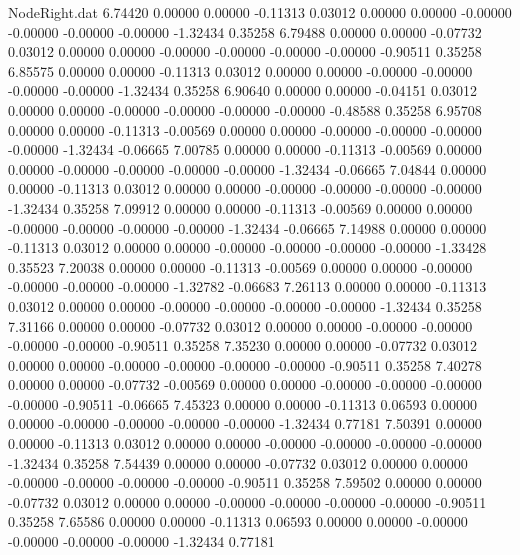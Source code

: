 \begin{filecontents}{NodeRight.dat}
   6.74420    0.00000    0.00000    -0.11313    0.03012    0.00000    0.00000   -0.00000   -0.00000   -0.00000   -0.00000   -1.32434    0.35258
   6.79488    0.00000    0.00000    -0.07732    0.03012    0.00000    0.00000   -0.00000   -0.00000   -0.00000   -0.00000   -0.90511    0.35258
   6.85575    0.00000    0.00000    -0.11313    0.03012    0.00000    0.00000   -0.00000   -0.00000   -0.00000   -0.00000   -1.32434    0.35258
   6.90640    0.00000    0.00000    -0.04151    0.03012    0.00000    0.00000   -0.00000   -0.00000   -0.00000   -0.00000   -0.48588    0.35258
   6.95708    0.00000    0.00000    -0.11313   -0.00569    0.00000    0.00000   -0.00000   -0.00000   -0.00000   -0.00000   -1.32434   -0.06665
   7.00785    0.00000    0.00000    -0.11313   -0.00569    0.00000    0.00000   -0.00000   -0.00000   -0.00000   -0.00000   -1.32434   -0.06665
   7.04844    0.00000    0.00000    -0.11313    0.03012    0.00000    0.00000   -0.00000   -0.00000   -0.00000   -0.00000   -1.32434    0.35258
   7.09912    0.00000    0.00000    -0.11313   -0.00569    0.00000    0.00000   -0.00000   -0.00000   -0.00000   -0.00000   -1.32434   -0.06665
   7.14988    0.00000    0.00000    -0.11313    0.03012    0.00000    0.00000   -0.00000   -0.00000   -0.00000   -0.00000   -1.33428    0.35523
   7.20038    0.00000    0.00000    -0.11313   -0.00569    0.00000    0.00000   -0.00000   -0.00000   -0.00000   -0.00000   -1.32782   -0.06683
   7.26113    0.00000    0.00000    -0.11313    0.03012    0.00000    0.00000   -0.00000   -0.00000   -0.00000   -0.00000   -1.32434    0.35258
   7.31166    0.00000    0.00000    -0.07732    0.03012    0.00000    0.00000   -0.00000   -0.00000   -0.00000   -0.00000   -0.90511    0.35258
   7.35230    0.00000    0.00000    -0.07732    0.03012    0.00000    0.00000   -0.00000   -0.00000   -0.00000   -0.00000   -0.90511    0.35258
   7.40278    0.00000    0.00000    -0.07732   -0.00569    0.00000    0.00000   -0.00000   -0.00000   -0.00000   -0.00000   -0.90511   -0.06665
   7.45323    0.00000    0.00000    -0.11313    0.06593    0.00000    0.00000   -0.00000   -0.00000   -0.00000   -0.00000   -1.32434    0.77181
   7.50391    0.00000    0.00000    -0.11313    0.03012    0.00000    0.00000   -0.00000   -0.00000   -0.00000   -0.00000   -1.32434    0.35258
   7.54439    0.00000    0.00000    -0.07732    0.03012    0.00000    0.00000   -0.00000   -0.00000   -0.00000   -0.00000   -0.90511    0.35258
   7.59502    0.00000    0.00000    -0.07732    0.03012    0.00000    0.00000   -0.00000   -0.00000   -0.00000   -0.00000   -0.90511    0.35258
   7.65586    0.00000    0.00000    -0.11313    0.06593    0.00000    0.00000   -0.00000   -0.00000   -0.00000   -0.00000   -1.32434    0.77181

\end{filecontents}

